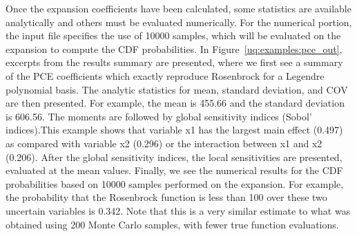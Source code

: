Once the expansion coefficients have been calculated, some statistics
are available analytically and others must be evaluated numerically.
For the numerical portion, the input file specifies the use of 10000
samples, which will be evaluated on the expansion to compute the CDF
probabilities. In Figure~\ref{uq:examples:pce_out}, excerpts from the
results summary are presented, where we first see a summary of the PCE
coefficients which exactly reproduce Rosenbrock for a Legendre
polynomial basis. The analytic statistics for mean, standard
deviation, and COV are then presented. For example, the mean is 455.66
and the standard deviation is 606.56. The moments are followed by
global sensitivity indices (Sobol' indices).This example shows that
variable x1 has the largest main effect (0.497) as compared with
variable x2 (0.296) or the interaction between x1 and x2 (0.206).
After the global sensitivity indices, the local sensitivities are
presented, evaluated at the mean values.  Finally, we see the
numerical results for the CDF probabilities based on 10000 samples
performed on the expansion. For example, the probability that the
Rosenbrock function is less than 100 over these two uncertain
variables is 0.342. Note that this is a very similar estimate to what
was obtained using 200 Monte Carlo samples, with fewer true function
evaluations.
